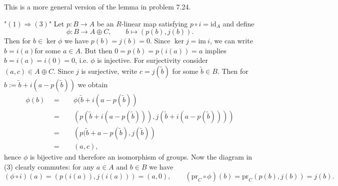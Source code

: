 \documentclass[11pt]{book}
\numberwithin{dummy}{section}
\theoremstyle{nonumberbreak}
\newenvironment{sol}[1][]{\ifthenelse{\equal{#1}{}}{\solution}{\solution[#1]}\rm}{\endsolution}
\newenvironment{prob}[1][]{\ifthenelse{\equal{#1}{}}{\problem}{\problem[#1]}\rm}{\endproblem}
\newcommand{\la}{\longrightarrow}
\newcommand{\id}{\mathrm{id}}
\begin{document}
\begin{spacing}{1.4}
\begin{prob}
\begin{sol}
\begin{compactenum}
\item This is a more general version of the lemma in problem 7.24.
\begin{compactenum}
\item["$(1)\Rightarrow (3)$"] Let $p: B \la A$ be an $R$-linear map satisfying $p \circ i = \id_A$ and define
$$\phi: B \la A \oplus C, \qquad b \mapsto (p(b), j(b)).$$
Then for $b \in \ker \phi$ we have $p(b)=j(b)=0$. Since $\ker j = \mathrm{im} \ i$, we can write $b=i(a)$for some $a \in A$. But then $0=p(b)=p(i(a))=a$ implies $b=i(a)=i(0)=0$, i.e. $\phi$ is injective. For surjectivity consider $(a,c) \in A \oplus C$. Since $j$ is surjective, write $c=j(\tilde{b})$ for some $\tilde{b}\in B$. Then for $b:= \tilde{b}+i(a-p(\tilde{b}))$ we obtain 
\begin{alignat*}{5}
\phi(b) \ \ &=&& \ \ \phi(\tilde{b} + i(a-p(\tilde{b})) \\
&=&& \ \ \left( p\left(\tilde{b} + i(a-p(\tilde{b}))\right), j\left(\tilde{b} + i(a-p(\tilde{b}))\right) \right) \\
&=&& \ \ \left( p(\tilde{b} + a - p(\tilde{b}) , j(\tilde{b})\right) \\
&=&& \ \ (a,c),
\end{alignat*}
hence $\phi$ is bijective and therefore an isomorphism of groups. Now the diagram in (3) clearly commutes: for any $a \in A$ and $b \in B$ we have 
$$(\phi \circ i)(a) = \left( p(i(a)), j(i(a))\right) = (a,0), \qquad (\mathrm{pr}_C \circ \phi)(b) = \mathrm{pr}_C(p(b), j(b)) =j(b).$$


\end{compactenum}
\end{compactenum}
\end{sol}
\end{prob}
\end{spacing}
\end{document}
